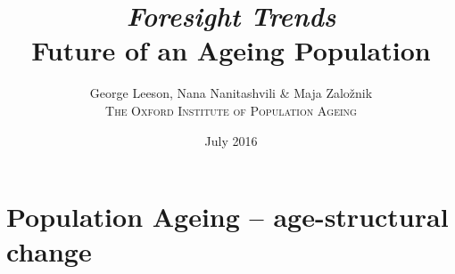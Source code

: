 \documentclass[11 pt, a4paper]{report}
\begin{document}
\title{\Large {\emph{Foresight Trends}}\\ \vspace{2cm}
\LARGE{Future of an Ageing Population}\\ \vspace{4cm}}



\author{George Leeson, Nana Nanitashvili \& Maja Zalo\v znik
\\
\textsc{\small The Oxford Institute of Population Ageing}\\ \vspace*{1cm} } 
\date{\small July 2016}

%
\maketitle

\setcounter{secnumdepth}{1}
\setcounter{tocdepth}{5}
\tableofcontents

\chapter{Population Ageing – age-structural change} %
\end{document}

